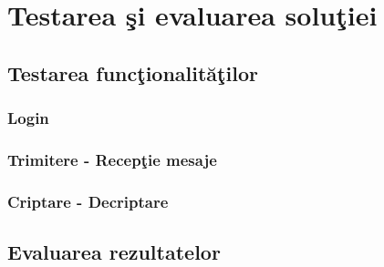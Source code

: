 \chapter{Testarea \c{s}i evaluarea solu\c{t}iei}
\section{Testarea func\c{t}ionalit\u{a}\c{t}ilor}
\subsection{Login}
\subsection{Trimitere - Recep\c{t}ie mesaje}
\subsection{Criptare - Decriptare}

\section{Evaluarea rezultatelor}